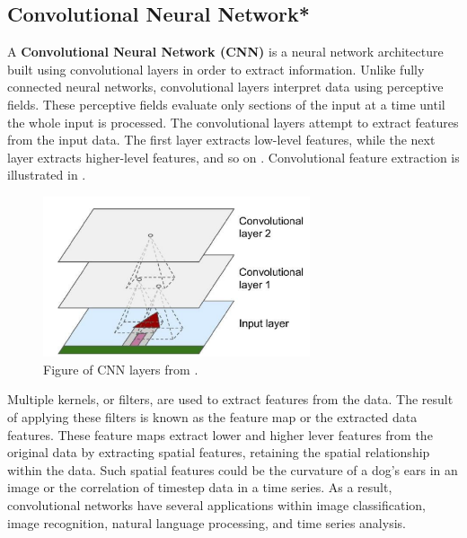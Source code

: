 \subsection{Convolutional Neural Network*}
\label{section:BT:CNN}
A \textbf{Convolutional Neural Network (CNN)} is a neural network architecture built using convolutional layers in order to extract information.
Unlike fully connected neural networks, convolutional layers interpret data using perceptive fields.
These perceptive fields evaluate only sections of the input at a time until the whole input is processed.
The convolutional layers attempt to extract features from the input data.
The first layer extracts low-level features, while the next layer extracts higher-level features, and so on
\cite[p.~443-446]{Geron2017}. Convolutional feature extraction is illustrated in .


\begin{figure}[h!]
  \centering
  \includegraphics[width=0.7\textwidth]{./sections/BT/figures/convolution_hands_one_machine_learning.png}
  \hfill
  \caption{Figure of CNN layers from \cite[p.~444]{Geron2017}.}
  \label{fig:convolution}
\end{figure}


Multiple kernels, or filters, are used to extract features from the data.
The result of applying these filters is known as the feature map or the extracted data features.
These feature maps extract lower and higher lever features from the original data by
extracting spatial features, retaining the spatial relationship within the data.
Such spatial features could be the curvature of a dog's ears in an image or the correlation of timestep data in a time series.
As a result, convolutional networks have several applications within image classification,
image recognition, natural language processing, and time series analysis.



